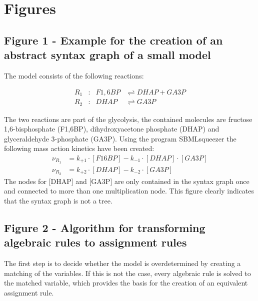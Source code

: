 \documentclass[10pt]{bmc_article}
\newenvironment{bmcformat}{\baselineskip20pt\sloppy\setboolean{publ}{false}}{\baselineskip20pt\sloppy}
\begin{document}
\begin{bmcformat}

\section*{Figures}

\subsection*{Figure 1 - Example for the creation of an abstract syntax graph of a small model}
The model consists of the following reactions:
\begin{center}
\parbox[c]{.35\textwidth}{\begin{align*}
R_{1}&:& F1,6BP &\rightleftharpoons DHAP + GA3P\\
R_{2}&:& DHAP   &\rightleftharpoons GA3P
\end{align*}}
\end{center}
The two reactions are part of the glycolysis, the contained molecules are fructose 1,6-bisphosphate (F1,6BP),
dihydroxyacetone phosphate (DHAP) and glyceraldehyde 3-phosphate (GA3P).
Using the program SBMLsqueezer \cite{Draeger2008} the following mass action kinetics have been created:
\begin{align*}
\nu_{R_{1}} &= k_{+1} \cdot [F16BP] - k_{-1} \cdot[DHAP] \cdot [GA3P]\\
\nu_{R_{2}} &= k_{+2} \cdot [DHAP]  - k_{-2} \cdot[GA3P]
\end{align*}
The nodes for [DHAP] and [GA3P] are only contained in the syntax graph once and connected to more than one multiplication node.
This figure clearly indicates that the syntax graph is not a tree.

\subsection*{Figure 2 - Algorithm for transforming algebraic rules to assignment rules}
The first step is to decide whether the model is overdetermined by creating a matching of the variables.
If this is not the case, every algebraic rule is solved to the matched variable,
which provides the basis for the creation of an equivalent assignment rule.


\end{bmcformat}
\end{document}
